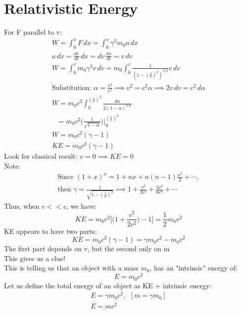 \documentclass[a4paper, 11pt, fleqn, normalem]{report}
\begin{document}
\section{Relativistic Energy}
For F parallel to v:
\begin{gather*}
    W = \int_{0}^{x} F\,dx = \int_{0}^{x} \gamma^{3} m_{0}a\,dx \\
    a\,dx = \frac{dv}{dt}\,dx = dv\,\frac{dx}{dt} = v\,dv \\
    W = \int_{0}^{v} m_{0}\gamma^{3}v\,dv = m_{0}\int_{0}^{v} \frac{1}{(1 - (\tfrac{v}{c})^{2})^{3/2}}v\,dv \\
    \text{Substitution: }\alpha = \frac{v^{2}}{c^{2}} \implies v^{2} = c^{2}\alpha \implies 2v\,dv = c^{2}\,d\alpha \\
    W = m_{0}c^{2}\int_{0}^{(\tfrac{v}{c})^{2}} \frac{d\alpha}{2(1 - \alpha)^{3/2}} \\
    ~~~ = m_{0}c^{2}\Big(\frac{1}{\sqrt{1 - \alpha}}\Big)\Bigg|_{0}^{(\tfrac{v}{c})^{2}} \\
    W = m_{0}c^{2}(\gamma - 1) \\
    KE = m_{0}c^{2}(\gamma - 1)
\end{gather*}
Look for classical result: $v = 0 \implies KE = 0$ \\
Note:
\begin{gather*}
    \text{Since }(1 + x)^{n} = 1 + nx + n(n - 1)\frac{x^{2}}{2} + \cdots,\\
    \text{then }\gamma = \frac{1}{\sqrt{1 - (\tfrac{v}{c})^{2}}} \implies 1 + \frac{v^{2}}{2c^{2}} + \frac{3v^{4}}{8c^{4}} + \cdots
\end{gather*}
Thus, when $v << c$, we have:
\begin{equation*}
    KE  = m_{0}c^{2}\Big[\Big(1 + \frac{v^{2}}{2c^{2}}\Big) - 1\Big] = \frac{1}{2}m_{0}v^{2}
\end{equation*}
KE appears to have two parts:
\begin{equation*}
    KE = m_{0}c^{2}(\gamma - 1) = \gamma m_{0}c^{2} - m_{0}c^{2}
\end{equation*}
The first part depends on v, but the second only on m \\
This gives us a clue! \\
This is telling us that an object with a mass $m_{0}$, has an "intrinsic" energy of:
\begin{equation*}
    E = m_{0}c^{2}
\end{equation*}
Let us define the total energy of an object as KE + intrinsic energy:
\begin{gather*}
    E = \gamma m_{0}c^{2},~~[m = \gamma m_{0}] \\
    \underline{E = mc^{2}}
\end{gather*}
\end{document}
